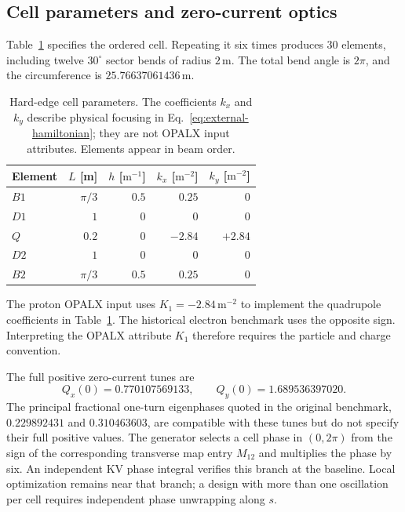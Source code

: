 \documentclass[11pt,a4paper]{article}
\numberwithin{equation}{section}
\newcommand{\units}[1]{\,\mathrm{#1}}
\begin{document}
\subsection{Cell parameters and zero-current optics}

Table~\ref{tab:cell} specifies the ordered cell. Repeating it six times
produces 30 elements, including twelve $30^\circ$ sector bends of radius
$2\units{m}$. The total bend angle is $2\pi$, and the circumference is
$25.76637061436\units{m}$.

\begin{table}[htbp]
  \centering
  \caption{Hard-edge cell parameters. The coefficients $k_x$ and $k_y$
  describe physical focusing in Eq.~\eqref{eq:external-hamiltonian}; they
  are not OPALX input attributes. Elements appear in beam order.}
  \label{tab:cell}
  \begin{tabular}{lrrrr}
    \toprule
    Element & $L$ [m] & $h$ [$\mathrm{m^{-1}}$]
      & $k_x$ [$\mathrm{m^{-2}}$] & $k_y$ [$\mathrm{m^{-2}}$]\\
    \midrule
    $B1$ & $\pi/3$ & $0.5$ & $0.25$ & $0$\\
    $D1$ & $1$ & $0$ & $0$ & $0$\\
    $Q$  & $0.2$ & $0$ & $-2.84$ & $+2.84$\\
    $D2$ & $1$ & $0$ & $0$ & $0$\\
    $B2$ & $\pi/3$ & $0.5$ & $0.25$ & $0$\\
    \bottomrule
  \end{tabular}
\end{table}

The proton OPALX input uses $K_1=-2.84\units{m^{-2}}$ to implement the
quadrupole coefficients in Table~\ref{tab:cell}. The historical electron
benchmark uses the opposite sign. Interpreting the OPALX attribute
$K_1$ therefore requires the particle and charge convention.

The full positive zero-current tunes are
\begin{equation}
  Q_x(0)=0.770107569133,\qquad Q_y(0)=1.689536397020.
  \label{eq:bare-tunes}
\end{equation}
The principal fractional one-turn eigenphases quoted in the original
benchmark, $0.229892431$ and $0.310463603$, are compatible with these
tunes but do not specify their full positive values. The generator selects
a cell phase in $(0,2\pi)$ from the sign of the corresponding transverse
map entry $M_{12}$ and multiplies the phase by six. An independent KV
phase integral verifies this branch at the baseline. Local optimization
remains near that branch; a design with more than one oscillation per
cell requires independent phase unwrapping along $s$.
\end{document}
